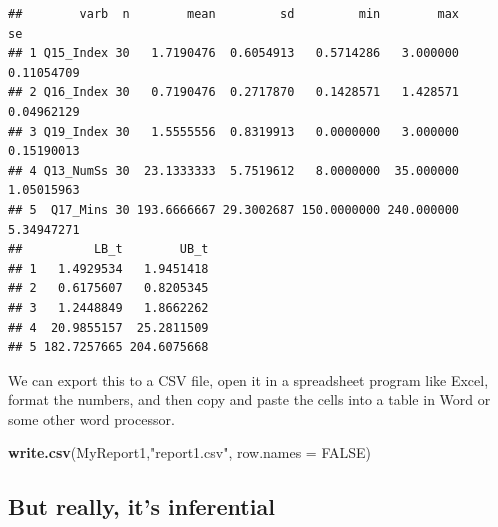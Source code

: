 \documentclass[
]{article}
\newenvironment{Shaded}{\begin{snugshade}}{\end{snugshade}}
\newcommand{\DataTypeTok}[1]{\textcolor[rgb]{0.13,0.29,0.53}{#1}}
\newcommand{\KeywordTok}[1]{\textcolor[rgb]{0.13,0.29,0.53}{\textbf{#1}}}
\newcommand{\NormalTok}[1]{#1}
\newcommand{\OtherTok}[1]{\textcolor[rgb]{0.56,0.35,0.01}{#1}}
\newcommand{\StringTok}[1]{\textcolor[rgb]{0.31,0.60,0.02}{#1}}
\begin{document}
\begin{verbatim}
##        varb  n        mean         sd         min        max         se
## 1 Q15_Index 30   1.7190476  0.6054913   0.5714286   3.000000 0.11054709
## 2 Q16_Index 30   0.7190476  0.2717870   0.1428571   1.428571 0.04962129
## 3 Q19_Index 30   1.5555556  0.8319913   0.0000000   3.000000 0.15190013
## 4 Q13_NumSs 30  23.1333333  5.7519612   8.0000000  35.000000 1.05015963
## 5  Q17_Mins 30 193.6666667 29.3002687 150.0000000 240.000000 5.34947271
##          LB_t        UB_t
## 1   1.4929534   1.9451418
## 2   0.6175607   0.8205345
## 3   1.2448849   1.8662262
## 4  20.9855157  25.2811509
## 5 182.7257665 204.6075668
\end{verbatim}

We can export this to a CSV file, open it in a spreadsheet program like Excel, format the numbers, and then copy and paste the cells into a table in Word or some other word processor.

\begin{Shaded}
\begin{Highlighting}[]
\KeywordTok{write.csv}\NormalTok{(MyReport1,}\StringTok{"report1.csv"}\NormalTok{, }\DataTypeTok{row.names =} \OtherTok{FALSE}\NormalTok{)}
\end{Highlighting}
\end{Shaded}

\hypertarget{but-really-its-inferential}{%
\subsection{But really, it's inferential}\label{but-really-its-inferential}}
\end{document}

